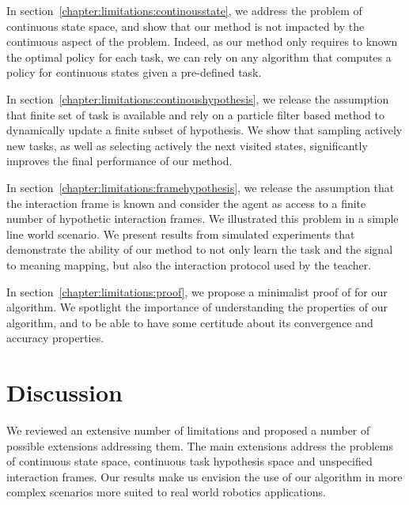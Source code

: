 In section~\ref{chapter:limitations:continousstate}, we address the problem of continuous state space, and show that our method is not impacted by the continuous aspect of the problem. Indeed, as our method only requires to known the optimal policy for each task, we can rely on any algorithm that computes a policy for continuous states given a pre-defined task.

In section~\ref{chapter:limitations:continoushypothesis}, we release the assumption that finite set of task is available and rely on a particle filter based method to dynamically update a finite subset of hypothesis. We show that sampling actively new tasks, as well as selecting actively the next visited states, significantly improves the final performance of our method.

In section~\ref{chapter:limitations:framehypothesis}, we release the assumption that the interaction frame is known and consider the agent as access to a finite number of hypothetic interaction frames. We illustrated this problem in a simple line world scenario. We present results from simulated experiments that demonstrate the ability of our method to not only learn the task and the signal to meaning mapping, but also the interaction protocol used by the teacher.

In section~\ref{chapter:limitations:proof}, we propose a minimalist proof of for our algorithm. We spotlight the importance of understanding the properties of our algorithm, and to be able to have some certitude about its convergence and accuracy properties.




% 



% 


\section{Discussion}
\label{chapter:limitations:discussion}

We reviewed an extensive number of limitations and proposed a number of possible extensions addressing them. The main extensions address the problems of continuous state space, continuous task hypothesis space and unspecified interaction frames. Our results make us envision the use of our algorithm in more complex scenarios more suited to real world robotics applications.
